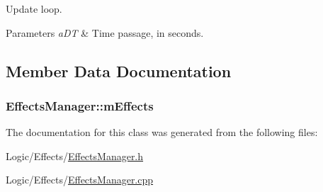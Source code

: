 Update loop. 


\begin{DoxyParams}{Parameters}
{\em a\+DT} & Time passage, in seconds. \\
\hline
\end{DoxyParams}


\subsection{Member Data Documentation}
\subsubsection[{\texorpdfstring{m\+Effects}{mEffects}}]{ Effects\+Manager\+::m\+Effects\hspace{0.3cm}{\ttfamily [private]}}\hypertarget{classEffectsManager_ad770a9f398b7261149c3ee7dcfbd08b9}{}\label{classEffectsManager_ad770a9f398b7261149c3ee7dcfbd08b9}


The documentation for this class was generated from the following files\+:\begin{DoxyCompactItemize}
\item 
Logic/\+Effects/\hyperlink{EffectsManager_8h}{Effects\+Manager.\+h}\item 
Logic/\+Effects/\hyperlink{EffectsManager_8cpp}{Effects\+Manager.\+cpp}\end{DoxyCompactItemize}
